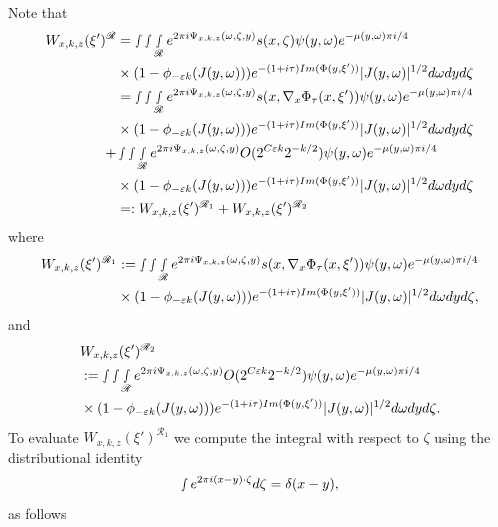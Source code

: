 \documentclass[12pt, reqno]{amsart}
\theoremstyle{definition}
\theoremstyle{remark}
\numberwithin{equation}{section}
\begin{document}
Note that
\begin{align*}
   W_{x,k,z}(\xi')^{\mathscr{R}} &=  \smallint\smallint\smallint_{\mathscr{R}} e^{2\pi i \Psi_{x,k,z}(\omega, \zeta,y) }s(x,\zeta)\psi(y,\omega)e^{-\mu(y,\omega)\pi i/4} \\
&\times (1-\phi_{-\varepsilon k}(J(y,\omega)))e^{-(1+i\tau)\textnormal{Im}(\Phi(y,\xi'))} |J(y,\omega)|^{1/2}d\omega dy d\zeta\\
&=  \smallint\smallint\smallint_{\mathscr{R}} e^{2\pi i \Psi_{x,k,z}(\omega, \zeta,y) }s(x,\nabla_{x}\Phi_\tau(x,\xi'))\psi(y,\omega)e^{-\mu(y,\omega)\pi i/4} \\
&\times (1-\phi_{-\varepsilon k}(J(y,\omega)))e^{-(1+i\tau)\textnormal{Im}(\Phi(y,\xi'))} |J(y,\omega)|^{1/2}d\omega dy d\zeta\\
+& \smallint\smallint\smallint_{\mathscr{R}} e^{2\pi i \Psi_{x,k,z}(\omega, \zeta,y) }O(2^{C\varepsilon k}2^{-k/2})\psi(y,\omega)e^{-\mu(y,\omega)\pi i/4} \\
&\times (1-\phi_{-\varepsilon k}(J(y,\omega)))e^{-(1+i\tau)\textnormal{Im}(\Phi(y,\xi'))} |J(y,\omega)|^{1/2}d\omega dy d\zeta\\
&=:   W_{x,k,z}(\xi')^{\mathscr{R}_1}+W_{x,k,z}(\xi')^{\mathscr{R}_2}
\end{align*} where 
\begin{align*}
  W_{x,k,z}(\xi')^{\mathscr{R}_1}  & :=  \smallint\smallint\smallint_{\mathscr{R}} e^{2\pi i \Psi_{x,k,z}(\omega, \zeta,y) }s(x,\nabla_{x}\Phi_\tau(x,\xi'))\psi(y,\omega)e^{-\mu(y,\omega)\pi i/4} \\
&\times (1-\phi_{-\varepsilon k}(J(y,\omega)))e^{-(1+i\tau)\textnormal{Im}(\Phi(y,\xi'))} |J(y,\omega)|^{1/2}d\omega dy d\zeta,  
\end{align*}
and 
\begin{align*}
&W_{x,k,z}(\xi')^{\mathscr{R}_2}\\
&:=  \smallint\smallint\smallint_{\mathscr{R}} e^{2\pi i \Psi_{x,k,z}(\omega, \zeta,y) }O(2^{C\varepsilon k}2^{-k/2})\psi(y,\omega)e^{-\mu(y,\omega)\pi i/4} \\
&\times (1-\phi_{-\varepsilon k}(J(y,\omega)))e^{-(1+i\tau)\textnormal{Im}(\Phi(y,\xi'))} |J(y,\omega)|^{1/2}d\omega dy d\zeta.
\end{align*}
To evaluate $ W_{x,k,z}(\xi')^{\mathscr{R}_1}$ we compute the integral with respect to $\zeta$ using the distributional identity $$
\smallint e^{2\pi i(x-y)\cdot \zeta}d\zeta=\delta(x-y),$$  as follows
\end{document}
